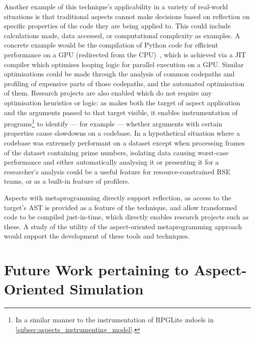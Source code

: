 
Another example of this technique's applicability in a variety of real-world
situations is that traditional aspects cannot make decisions based on reflection
on specific properties of the code they are being applied to. This could include
calculations made, data accessed, or computational complexity as examples. A
concrete example would be the compilation of Python code for efficient
performance on a GPU (redirected from the CPU)~\cite{dejice2020thesis}, which is
achieved via a JIT compiler which optimises looping logic for parallel execution
on a GPU. Similar optimisations could be made through the analysis of common
codepaths and profiling of expensive parts of those codepaths, and the automated
optimisation of them. Research projects are also enabled which do not require
any optimisation heuristics or logic: as \pdsf makes both the target of aspect
application and the arguments passed to that target visible, it enables
instrumentation of programs\footnote{In a similar manner to the instrumentation
of RPGLite mdoels in \cref{subsec:aspects_instrumenting_model}.} to identify ---
for example --- whether arguments with certain properties cause slowdowns on a
codebase. In a hypothetical situation where a codebase was extremely performant
on a dataset except when processing frames of the dataset containing prime
numbers, isolating data causing worst-case performance and either automatically
analysing it or presenting it for a researcher's analysis could be a useful
feature for resource-constrained RSE teams, or as a built-in feature of
profilers.

Aspects with metaprogramming directly support reflection, as access to the
target's AST is provided as a feature of the technique, and allow transformed
code to be compiled just-in-time, which directly enables research projects such
as these. A study of the utility of the aspect-oriented metaprogramming approach
would support the development of these tools and techniques.


\section{Future Work pertaining to Aspect-Oriented Simulation}\label{sec:future_work_simulations}

